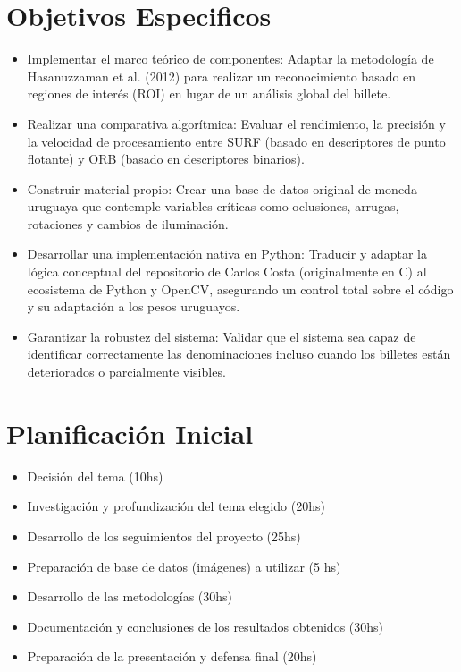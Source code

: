 \documentclass[12pt, a4paper]{article}
\begin{document}
\newpage

\section*{Objetivos Especificos}

\begin{itemize}
    \item Implementar el marco teórico de componentes: Adaptar la metodología de 
        Hasanuzzaman et al. (2012) para realizar un reconocimiento basado en regiones 
        de interés (ROI) en lugar de un análisis global del billete.

    \item Realizar una comparativa algorítmica: Evaluar el rendimiento, la precisión y 
        la velocidad de procesamiento entre SURF (basado en descriptores de punto 
        flotante) y ORB (basado en descriptores binarios).

    \item Construir material propio: Crear una base de datos original de moneda uruguaya 
        que contemple variables críticas como oclusiones, arrugas, rotaciones y 
        cambios de iluminación.

    \item Desarrollar una implementación nativa en Python: Traducir y adaptar la lógica 
        conceptual del repositorio de Carlos Costa (originalmente en C) al ecosistema 
        de Python y OpenCV, asegurando un control total sobre el código y su 
        adaptación a los pesos uruguayos.

    \item Garantizar la robustez del sistema: Validar que el sistema sea capaz de 
        identificar correctamente las denominaciones incluso cuando los billetes están 
        deteriorados o parcialmente visibles.

\end{itemize}

\section*{Planificación Inicial}

\begin{itemize}
    \item Decisión del tema (10hs)
    \item Investigación y profundización del tema elegido (20hs)
    \item Desarrollo de los seguimientos del proyecto (25hs)
    \item Preparación de base de datos (imágenes) a utilizar (5 hs)
    \item Desarrollo de las metodologías (30hs)
    \item Documentación y conclusiones de los resultados obtenidos (30hs)
    \item Preparación de la presentación y defensa final (20hs)
\end{itemize}
\end{document}
